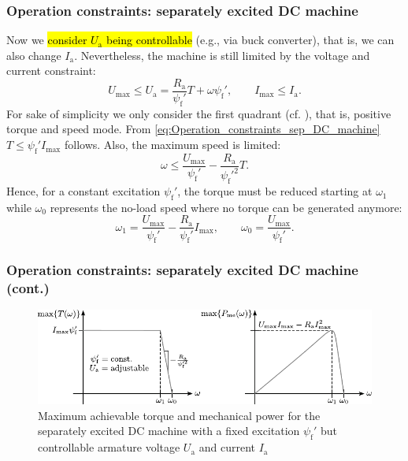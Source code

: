 \begin{frame}
	\frametitle{Operation constraints: separately excited DC machine}
			Now we \hl{consider $U_\mathrm{a}$ being controllable} (e.g., via buck converter), that is, we can also change $I_\mathrm{a}$. Nevertheless, the machine is still limited by the voltage and current constraint:
			\begin{equation}
				U_\mathrm{max} \leq U_\mathrm{a} = \frac{R_\mathrm{a}}{\psi_\mathrm{f}'} T + \omega \psi_\mathrm{f}', \qquad I_\mathrm{max} \leq I_\mathrm{a}.
				\label{eq:Operation_constraints_sep_DC_machine}
			\end{equation} \pause
			For sake of simplicity we only consider the first quadrant (cf. ), that is, positive torque and speed mode. \pause From \eqref{eq:Operation_constraints_sep_DC_machine} $T\leq \psi_\mathrm{f}' I_\mathrm{max}$ follows. \pause Also, the maximum speed is limited:
			\begin{equation}
				\omega \leq \frac{U_\mathrm{max}}{\psi_\mathrm{f}'} - \frac{R_\mathrm{a}}{\psi_\mathrm{f}'^2} T.
			\end{equation} \pause
			Hence, for a constant excitation $\psi_\mathrm{f}'$, the torque must be reduced starting at $\omega_1$ while $\omega_0$ represents the no-load speed where no torque can be generated anymore:
			\begin{equation}
				\omega_1 = \frac{U_\mathrm{max}}{\psi_\mathrm{f}'} - \frac{R_\mathrm{a}}{\psi_\mathrm{f}'} I_\mathrm{max}, \qquad \omega_0 = \frac{U_\mathrm{max}}{\psi_\mathrm{f}'}.
			\end{equation}
\end{frame}

\begin{frame}
	\frametitle{Operation constraints: separately excited DC machine (cont.)}
	\begin{figure}
		\centering
		\includegraphics[scale=1.1]{fig/lec03/Sep_DC_machine_voltage_current_const.pdf}
		\caption{Maximum achievable torque and mechanical power for the separately excited DC machine with a fixed excitation $\psi_\mathrm{f}'$ but controllable armature voltage $U_\mathrm{a}$ and current $I_\mathrm{a}$}
		\label{fig:Sep_DC_machine_voltage_current_const}
\end{figure}
\end{frame}

